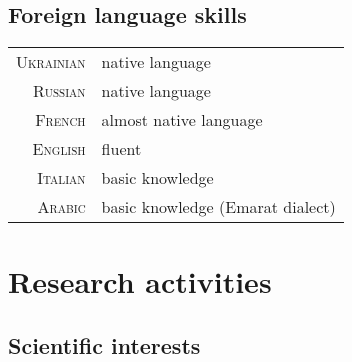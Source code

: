\documentclass[final, a4paper, oneside, 12pt]{article}
\numberwithin{equation}{section}
\begin{document}

\subsection{Foreign language skills}

\begin{tabular}{rl}

      \textsc{Ukrainian} & native language \\
      \textsc{Russian} & native language \\
      \textsc{French} & almost native language \\
      \textsc{English} & fluent \\
      \textsc{Italian} & basic knowledge \\
      \textsc{Arabic} & basic knowledge (Emarat dialect) \\
      
\end{tabular}

    
\section{Research activities}

\subsection{Scientific interests}
\end{document}
